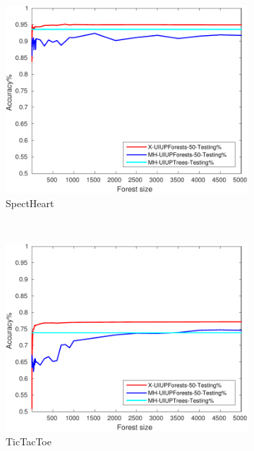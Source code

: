 \begin{figure}[ht]
\begin{subfigure}[b]{0.3\textwidth}
  	\includegraphics[width=\textwidth]{figs/PLPTF/Forests/SpectHeartDownsampledFurther_Forests_X_MH.pdf}
  	\caption{SpectHeart}
		\label{fig:S3}
	\end{subfigure}
  \\
  \begin{subfigure}[b]{0.3\textwidth}
		\centering
  	\includegraphics[width=\textwidth]{figs/PLPTF/Forests/TicTacToe_Forests_X_MH.pdf}
  	\caption{TicTacToe}
		\label{fig:T3}
	\end{subfigure}
  \begin{subfigure}[b]{0.3\textwidth}
		\centering

\end{subfigure}
\end{figure}
